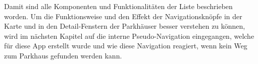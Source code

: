Damit sind alle Komponenten und Funktionalitäten der Liste beschrieben worden. Um die Funktionsweise und den Effekt der Navigationsknöpfe in der Karte und in den Detail-Fenstern der Parkhäuser besser verstehen zu können, wird im nächsten Kapitel auf die interne Pseudo-Navigation eingegangen, welche für diese App erstellt wurde und wie diese Navigation reagiert, wenn kein Weg zum Parkhaus gefunden werden kann.

